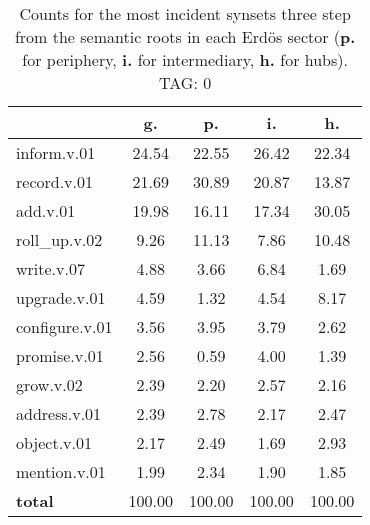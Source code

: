 \begin{table}[h!]
\begin{center}
\begin{tabular}{| l | c | c | c | c |}\hline
 & g. & p. & i. & h. \\\hline
inform.v.01 & 24.54  & 22.55  & 26.42  & 22.34 \\\hline
record.v.01 & 21.69  & 30.89  & 20.87  & 13.87 \\\hline
add.v.01 & 19.98  & 16.11  & 17.34  & 30.05 \\\hline
roll\_up.v.02 & 9.26  & 11.13  & 7.86  & 10.48 \\\hline
write.v.07 & 4.88  & 3.66  & 6.84  & 1.69 \\\hline
upgrade.v.01 & 4.59  & 1.32  & 4.54  & 8.17 \\\hline
configure.v.01 & 3.56  & 3.95  & 3.79  & 2.62 \\\hline
promise.v.01 & 2.56  & 0.59  & 4.00  & 1.39 \\\hline
grow.v.02 & 2.39  & 2.20  & 2.57  & 2.16 \\\hline
address.v.01 & 2.39  & 2.78  & 2.17  & 2.47 \\\hline
object.v.01 & 2.17  & 2.49  & 1.69  & 2.93 \\\hline
mention.v.01 & 1.99  & 2.34  & 1.90  & 1.85 \\\hline
{{\bf total}} & 100.00  & 100.00  & 100.00  & 100.00 \\\hline
\end{tabular}
\caption{Counts for the most incident synsets three step from the semantic roots in each Erd\"os sector ({\bf p.} for periphery, {\bf i.} for intermediary, {\bf h.} for hubs). TAG: 0}
\end{center}
\end{table}